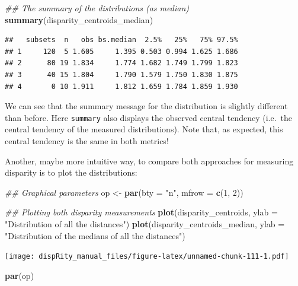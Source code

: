 \documentclass[
]{book}
\newenvironment{Shaded}{\begin{snugshade}}{\end{snugshade}}
\newcommand{\CommentTok}[1]{\textcolor[rgb]{0.56,0.35,0.01}{\textit{#1}}}
\newcommand{\DataTypeTok}[1]{\textcolor[rgb]{0.13,0.29,0.53}{#1}}
\newcommand{\DecValTok}[1]{\textcolor[rgb]{0.00,0.00,0.81}{#1}}
\newcommand{\KeywordTok}[1]{\textcolor[rgb]{0.13,0.29,0.53}{\textbf{#1}}}
\newcommand{\NormalTok}[1]{#1}
\newcommand{\StringTok}[1]{\textcolor[rgb]{0.31,0.60,0.02}{#1}}
\begin{document}
\begin{Shaded}
\begin{Highlighting}[]
\CommentTok{\#\# The summary of the distributions (as median)}
\KeywordTok{summary}\NormalTok{(disparity\_centroids\_median)}
\end{Highlighting}
\end{Shaded}

\begin{verbatim}
##   subsets  n   obs bs.median  2.5%   25%   75% 97.5%
## 1     120  5 1.605     1.395 0.503 0.994 1.625 1.686
## 2      80 19 1.834     1.774 1.682 1.749 1.799 1.823
## 3      40 15 1.804     1.790 1.579 1.750 1.830 1.875
## 4       0 10 1.911     1.812 1.659 1.784 1.859 1.930
\end{verbatim}

We can see that the summary message for the distribution is slightly different than before.
Here \texttt{summary} also displays the observed central tendency (i.e.~the central tendency of the measured distributions).
Note that, as expected, this central tendency is the same in both metrics!

Another, maybe more intuitive way, to compare both approaches for measuring disparity is to plot the distributions:

\begin{Shaded}
\begin{Highlighting}[]
\CommentTok{\#\# Graphical parameters}
\NormalTok{op \textless{}{-}}\StringTok{ }\KeywordTok{par}\NormalTok{(}\DataTypeTok{bty =} \StringTok{"n"}\NormalTok{, }\DataTypeTok{mfrow =} \KeywordTok{c}\NormalTok{(}\DecValTok{1}\NormalTok{, }\DecValTok{2}\NormalTok{))}

\CommentTok{\#\# Plotting both disparity measurements}
\KeywordTok{plot}\NormalTok{(disparity\_centroids,}
     \DataTypeTok{ylab =} \StringTok{"Distribution of all the distances"}\NormalTok{)}
\KeywordTok{plot}\NormalTok{(disparity\_centroids\_median,}
     \DataTypeTok{ylab =} \StringTok{"Distribution of the medians of all the distances"}\NormalTok{)}
\end{Highlighting}
\end{Shaded}

\texttt{[image: dispRity\_manual\_files/figure-latex/unnamed-chunk-111-1.pdf]}

\begin{Shaded}
\begin{Highlighting}[]
\KeywordTok{par}\NormalTok{(op)}
\end{Highlighting}
\end{Shaded}
\end{document}
